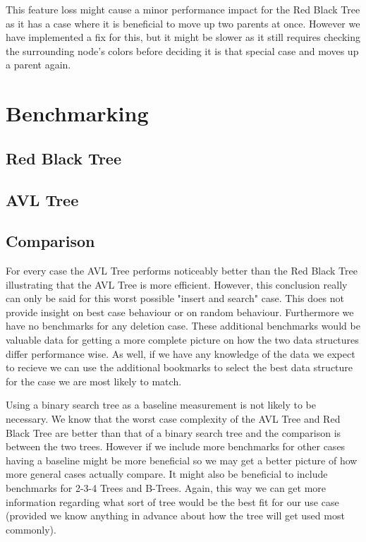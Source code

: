 \documentclass[11pt, letterpaper]{article}
\begin{document}
This feature loss might cause a minor performance impact for the Red Black Tree as it has a case where it is beneficial
to move up two parents at once.  However we have implemented a fix for this, but it might be slower as it still requires
checking the surrounding node's colors before deciding it is that special case and moves up a parent again.

\section{Benchmarking}

\subsection{Red Black Tree}

\subsection{AVL Tree}

\subsection{Comparison}
For every case the AVL Tree performs noticeably better than the Red Black Tree illustrating that the AVL Tree is more efficient.
However, this conclusion really can only be said for this worst possible "insert and search" case.  This does not provide insight on best case behaviour or on random behaviour.
Furthermore we have no benchmarks for any deletion case.  These additional benchmarks would be valuable data for getting a more complete picture on how
the two data structures differ performance wise.  As well, if we have any knowledge of the data we expect to recieve we can use the additional bookmarks to select the best data structure for the
case we are most likely to match.

Using a binary search tree as a baseline measurement is not likely to be necessary.  We know that the worst case complexity of the AVL Tree and Red Black Tree are better than
that of a binary search tree and the comparison is between the two trees.  However if we include more benchmarks for other cases having a baseline might be more beneficial
so we may get a better picture of how more general cases actually compare.  It might also be beneficial to include benchmarks for 2-3-4 Trees and B-Trees.  Again, this way we can get
more information regarding what sort of tree would be the best fit for our use case (provided we know anything in advance about how the tree will get used most commonly).
\end{document}

